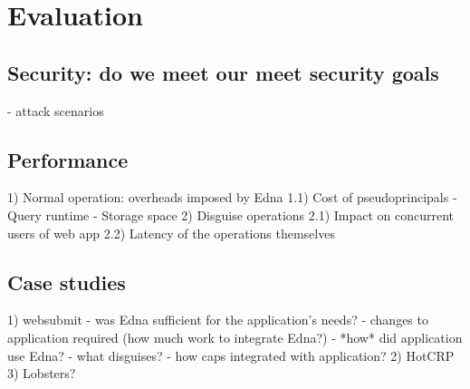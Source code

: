 \section{Evaluation}

\subsection{Security: do we meet our meet security goals}
   - attack scenarios

\subsection{Performance}


   1) Normal operation: overheads imposed by Edna
    1.1) Cost of pseudoprincipals
         - Query runtime
         - Storage space
   2) Disguise operations
    2.1) Impact on concurrent users of web app
    2.2) Latency of the operations themselves

\subsection{Case studies}
   1) websubmit
      - was Edna sufficient for the application's needs?
      - changes to application required (how much work to integrate Edna?)
      - *how* did application use Edna?
        - what disguises?
        - how caps integrated with application?
   2) HotCRP
   3) Lobsters?


